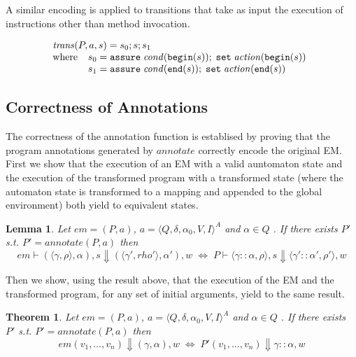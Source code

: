 \documentclass[10pt,notitlepage,twoside]{article}
\newcommand{\aut}{a}
\newcommand{\automata}[5]{\langle #1,#2,#3,#4,#5 \rangle^A}
\newcommand{\qu}{\alpha}
\newcommand{\theautomaton}{\automata{Q}{\delta}{\qu_0}{V}{I}}
\newcommand{\emdef}[2]{(#1,#2)}
\newcommand{\state}[1]{\langle #1 \rangle}
\newcommand{\genv}{\gamma}
\newtheorem{theorem}{Theorem}
\newtheorem{lemma}{Lemma}
\begin{document}
A similar encoding is applied to transitions that take as input the execution of instructions other than method invocation.

\begin{displaymath}
\begin{array}{l}
\mathit{trans}(P,\aut,s) = s_0; s; s_1 \\
\mbox{where}\;\;
\begin{array}[t]{l}
s_0 = \texttt{assure}\; \mathit{cond}(\texttt{begin}(s));\; \texttt{set}\;\mathit{action}(\texttt{begin}(s)) \\
s_1 = \texttt{assure}\; \mathit{cond}(\texttt{end}(s));\; \texttt{set}\;\mathit{action}(\texttt{end}(s))
\end{array}
\end{array}
\end{displaymath}


\subsection{Correctness of Annotations}

The correctness of the annotation function is establised by proving that  the program annotations generated by  $\mathit{annotate}$ correctly encode the original EM. First we show that the execution of an EM with a valid auntomaton state and the execution of the transformed program with a transformed state (where the automaton state is transformed to a mapping and appended to the global environment) both yield to equivalent states. 

\begin{lemma}
Let  $em = \emdef{P}{\aut}$, $\aut = \theautomaton$ and  $\qu \in Q$ . If there exists $P'$ s.t. $P' = \mathit{annotate}(P,\aut)$ then
\begin{displaymath}
em \vdash (\state{\genv,\rho},\qu),s \Downarrow (\state{\genv',rho'},\qu'),w
\;\Leftrightarrow\;
P \vdash \state{\genv::\qu,\rho},s \Downarrow \state{\genv'::\qu',\rho'},w
\end{displaymath}
\end{lemma}

Then we show, using the result above, that the execution of the EM and the transformed program, for any set of initial arguments, yield to the same result.

\begin{theorem}
Let  $em = \emdef{P}{\aut}$, $\aut = \theautomaton$ and  $\qu \in Q$ . If there exists $P'$ s.t. $P' = \mathit{annotate}(P,\aut)$ then
\begin{displaymath}
em(v_1,\ldots,v_n) \Downarrow (\genv,\qu),w
\;\Leftrightarrow\;
P'(v_1,\ldots,v_n) \Downarrow \genv::\qu,w
\end{displaymath}

\end{theorem}
\end{document}
